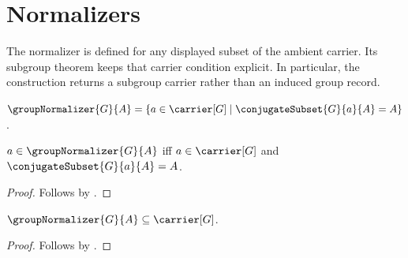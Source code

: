 

\section{Normalizers}

The normalizer is defined for any displayed subset of the ambient carrier.
Its subgroup theorem keeps that carrier condition explicit.  In particular,
the construction returns a subgroup carrier rather than an induced group
record.

\begin{definition}\label{group_normalizer}
    $\groupNormalizer{G}{A}=
        \{a\in\carrier[G]\mid
            \conjugateSubset{G}{a}{A}=A\}$.
\end{definition}

\begin{proposition}\label{group_normalizer_iff}
    $a\in\groupNormalizer{G}{A}$ iff
        $a\in\carrier[G]$ and
        $\conjugateSubset{G}{a}{A}=A$.
\end{proposition}
\begin{proof}
    Follows by .
\end{proof}

\begin{proposition}\label{group_normalizer_subseteq}
    $\groupNormalizer{G}{A}\subseteq\carrier[G]$.
\end{proposition}
\begin{proof}
    Follows by .
\end{proof}

